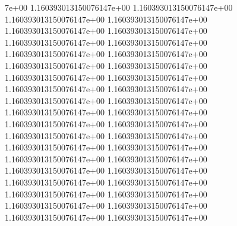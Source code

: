 7e+00	1.160393013150076147e+00	1.160393013150076147e+00	1.160393013150076147e+00	1.160393013150076147e+00	1.160393013150076147e+00	1.160393013150076147e+00	1.160393013150076147e+00	1.160393013150076147e+00	1.160393013150076147e+00	1.160393013150076147e+00	1.160393013150076147e+00	1.160393013150076147e+00	1.160393013150076147e+00	1.160393013150076147e+00	1.160393013150076147e+00	1.160393013150076147e+00	1.160393013150076147e+00	1.160393013150076147e+00	1.160393013150076147e+00	1.160393013150076147e+00	1.160393013150076147e+00	1.160393013150076147e+00	1.160393013150076147e+00	1.160393013150076147e+00	1.160393013150076147e+00	1.160393013150076147e+00	1.160393013150076147e+00	1.160393013150076147e+00	1.160393013150076147e+00	1.160393013150076147e+00	1.160393013150076147e+00	1.160393013150076147e+00	1.160393013150076147e+00	1.160393013150076147e+00	1.160393013150076147e+00	1.160393013150076147e+00	1.160393013150076147e+00	1.160393013150076147e+00
